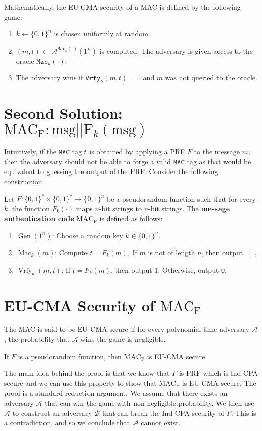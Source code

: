\documentclass{article}
\begin{document}
Mathematically, the EU-CMA security of a MAC is defined by the following game:
\begin{enumerate}
    \item $k \leftarrow \{0,1\}^n$ is chosen uniformly at random.
    \item $(m,t) \leftarrow \mathcal{A}^{\texttt{Mac}_k(\cdot)}(1^n)$ is computed. The adversary is given access to the oracle $\texttt{Mac}_k(\cdot)$.
    \item The adversary wins if $\texttt{Vrfy}_k(m,t) = 1$ and $m$ was not queried to the oracle.
\end{enumerate}
\section{Second Solution: $\operatorname{MAC_F}: \text{msg}||\text{F}_k(\text{msg})$}
Intuitively, if the $\texttt{MAC}$ tag $t$ is obtained by applying a PRF $F$ to the message $m$, then the adversary should not be able to forge a valid $\texttt{MAC}$ tag as that would be equivalent to guessing the output of the PRF. Consider the following construction:
\begin{definition}
    Let $F: \{0,1\}^* \times \{0,1\}^* \rightarrow \{0,1\}^n$ be a pseudorandom function such that for every $k$, the function $F_k(\cdot)$ maps $n$-bit strings to $n$-bit strings. The \textbf{message authentication code} $\operatorname{MAC_F}$ is defined as follows:
    \begin{enumerate}
        \item $\operatorname{Gen}(1^n)$: Choose a random key $k \in \{0,1\}^n$.
        \item $\operatorname{Mac}_k(m)$: Compute $t = F_k(m)$. If $m$ is not of length $n$, then output $\perp$.
        \item $\operatorname{Vrfy}_k(m,t)$: If $t = F_k(m)$, then output 1. Otherwise, output 0.
    \end{enumerate}
\end{definition}
\section{EU-CMA Security of $\operatorname{MAC_F}$}
The MAC is said to be EU-CMA secure if for every polynomial-time adversary $\mathcal{A}$, the probability that $\mathcal{A}$ wins the game is negligible.
\begin{theorem}
If $F$ is a pseudorandom function, then $\operatorname{MAC_F}$ is EU-CMA secure.
\end{theorem}
The main idea behind the proof is that we know that $F$ is PRF which is Ind-CPA secure and we can use this property to show that $\operatorname{MAC_F}$ is EU-CMA secure. The proof is a standard reduction argument. We assume that there exists an adversary $\mathcal{A}$ that can win the game with non-negligible probability. We then use $\mathcal{A}$ to construct an adversary $\mathcal{B}$ that can break the Ind-CPA security of $F$. This is a contradiction, and so we conclude that $\mathcal{A}$ cannot exist.
\end{document}
